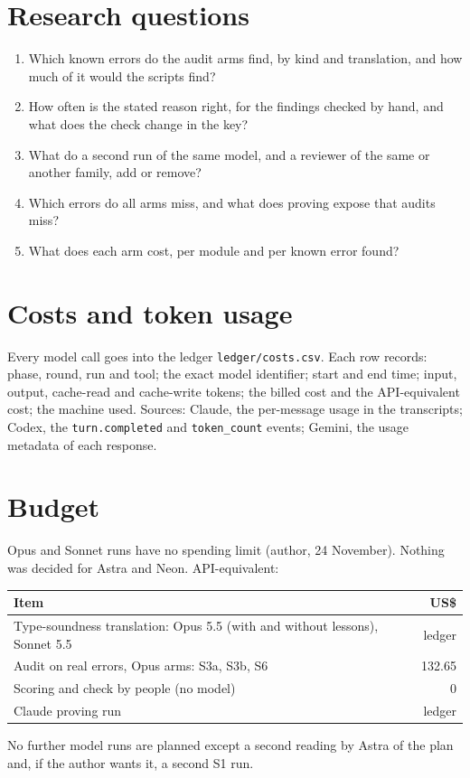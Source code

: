 \documentclass[11pt,a4paper]{article}
\newcommand{\code}[1]{\texttt{#1}}
\begin{document}
\section{Research questions}
\begin{enumerate}[label=RQ\arabic*.]
\item Which known errors do the audit arms find, by kind and translation, and how much of it would the scripts find?
\item How often is the stated reason right, for the findings checked by hand, and what does the check change in the key?
\item What do a second run of the same model, and a reviewer of the same or another family, add or remove?
\item Which errors do all arms miss, and what does proving expose that audits miss?
\item What does each arm cost, per module and per known error found?
\end{enumerate}

\section{Costs and token usage}
Every model call goes into the ledger \code{ledger/costs.csv}. Each row records: phase, round, run and tool; the exact model identifier; start and end time; input, output, cache-read and cache-write tokens; the billed cost and the API-equivalent cost; the machine used. Sources: Claude, the per-message usage in the transcripts; Codex, the \code{turn.completed} and \code{token\_count} events; Gemini, the usage metadata of each response.

\section{Budget}
Opus and Sonnet runs have no spending limit (author, 24 November). Nothing was decided for Astra and Neon. API-equivalent:
\begin{tabularx}{\textwidth}{@{}Xr@{}}
\toprule
Item & US\$\\
\midrule
Type-soundness translation: Opus 5.5 (with and without lessons), Sonnet 5.5 & ledger\\
Audit on real errors, Opus arms: S3a, S3b, S6 & 132.65\\
Scoring and check by people (no model) & 0\\
Claude proving run & ledger\\
\bottomrule
\end{tabularx}
No further model runs are planned except a second reading by Astra of the plan and, if the author wants it, a second S1 run.
\end{document}

